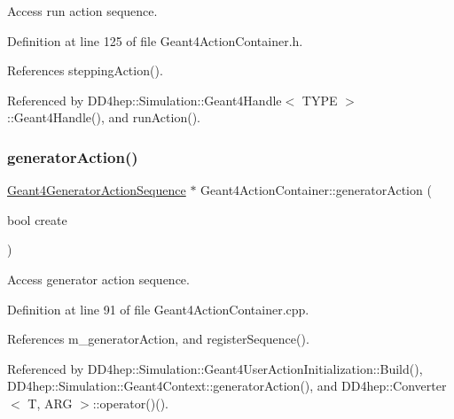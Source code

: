 Access run action sequence. 



Definition at line 125 of file Geant4\+Action\+Container.\+h.



References stepping\+Action().



Referenced by D\+D4hep\+::\+Simulation\+::\+Geant4\+Handle$<$ T\+Y\+P\+E $>$\+::\+Geant4\+Handle(), and run\+Action().

\hypertarget{class_d_d4hep_1_1_simulation_1_1_geant4_action_container_aac0430d56fb1bc7db0b71720c49033a4}{}\label{class_d_d4hep_1_1_simulation_1_1_geant4_action_container_aac0430d56fb1bc7db0b71720c49033a4} 
\subsubsection{\texorpdfstring{generator\+Action()}{generatorAction()}\hspace{0.1cm}{\footnotesize\ttfamily [1/2]}}
{\footnotesize\ttfamily \hyperlink{class_d_d4hep_1_1_simulation_1_1_geant4_generator_action_sequence}{Geant4\+Generator\+Action\+Sequence} $\ast$ Geant4\+Action\+Container\+::generator\+Action (\begin{DoxyParamCaption}\item[{bool}]{create }\end{DoxyParamCaption})}



Access generator action sequence. 



Definition at line 91 of file Geant4\+Action\+Container.\+cpp.



References m\+\_\+generator\+Action, and register\+Sequence().



Referenced by D\+D4hep\+::\+Simulation\+::\+Geant4\+User\+Action\+Initialization\+::\+Build(), D\+D4hep\+::\+Simulation\+::\+Geant4\+Context\+::generator\+Action(), and D\+D4hep\+::\+Converter$<$ T, A\+R\+G $>$\+::operator()().

\hypertarget{class_d_d4hep_1_1_simulation_1_1_geant4_action_container_a1c16fc087f37dc5350691bcc89a7a40e}{}\label{class_d_d4hep_1_1_simulation_1_1_geant4_action_container_a1c16fc087f37dc5350691bcc89a7a40e} 
